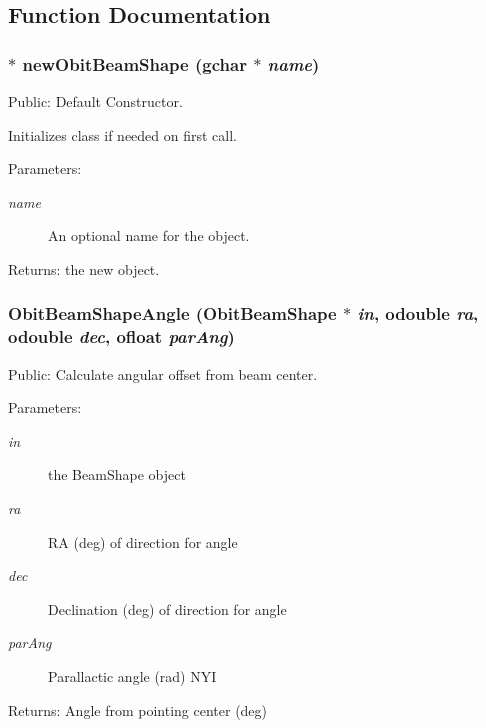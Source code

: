 \subsection{Function Documentation}
\subsubsection{$\ast$ new\-Obit\-Beam\-Shape (gchar $\ast$ {\em name})}\label{ObitBeamShape_8h_a8}


Public: Default Constructor. 

Initializes class if needed on first call. \begin{Desc}
\item[Parameters:]
\begin{description}
\item[{\em name}]An optional name for the object. \end{description}
\end{Desc}
\begin{Desc}
\item[Returns:]the new object. \end{Desc}
\subsubsection{ Obit\-Beam\-Shape\-Angle ({\bf Obit\-Beam\-Shape} $\ast$ {\em in}, {\bf odouble} {\em ra}, {\bf odouble} {\em dec}, {\bf ofloat} {\em par\-Ang})}\label{ObitBeamShape_8h_a15}


Public: Calculate angular offset from beam center. 

\begin{Desc}
\item[Parameters:]
\begin{description}
\item[{\em in}]the Beam\-Shape object \item[{\em ra}]RA (deg) of direction for angle \item[{\em dec}]Declination (deg) of direction for angle \item[{\em par\-Ang}]Parallactic angle (rad) NYI \end{description}
\end{Desc}
\begin{Desc}
\item[Returns:]Angle from pointing center (deg) \end{Desc}
